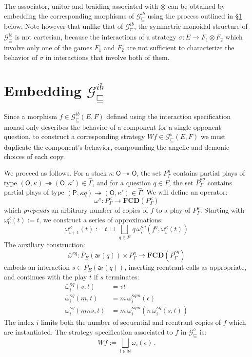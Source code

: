 \documentclass[draft,11pt]{report}
\newcommand{\gcat}{\mathcal{G}_{\sqsubseteq}}
\newcommand{\kw}[1]{\ensuremath{ \mathsf{#1} }}
\begin{document}
The associator, unitor and braiding
associated with $\otimes$
can be obtained by embedding
the corresponding morphisms of $\gcat^{ib}$
using the process outlined in \S\ref{sec:gamesem:emb} below.
Note however that unlike that of $\gcat^{ib}$,
the symmetric monoidal structure of $\gcat^{ib}$
is not cartesian,
because the interactions of a strategy
$\sigma : E \rightarrow F_1 \otimes F_2$
which involve only one of the games $F_1$ and $F_2$
are not sufficient to characterize the behavior of $\sigma$
in interactions that involve both of them.


\section{Embedding $\gcat^{ib}$} \label{sec:gamesem:emb} %

Since a morphism $f \in \gcat^{ib}(E,F)$
defined using the interaction specification monad
only describes the behavior of a component
for a single opponent question,
to construct a corresponding strategy $W f \in \gcat^b(E,F)$
we must duplicate the component's behavior,
compounding the angelic and demonic choices of each copy.

We proceed as follows.
For a stack
$\kappa : \kw{O} \twoheadrightarrow \kw{O}$,
the set $P^\kappa_\Gamma$ contains
partial plays of type
$(\kw{O}, \kappa) \twoheadrightarrow (\kw{O}, \kappa')
 \in \hat{\Gamma}$,
and for a question $q \in F$,
the set $\bar{P}^{\kappa q}_\Gamma$ contains
partial plays of type
$(\kw{P}, \kappa q) \twoheadrightarrow (\kw{O}, \kappa')
 \in \hat{\Gamma}$.
We will define an operator:
\[
  \omega^\kappa :
    P^\kappa_\Gamma \rightarrow
    \mathbf{FCD}(P^\kappa_\Gamma)
\]
which \emph{prepends} an arbitrary number of copies of $f$
to a play of $P^\kappa_\Gamma$.
Starting with 
$\omega^\kappa_0(t) := t$,
we construct a series of approximations:
\[
  \omega^\kappa_{i+1}(t) :=
    t \: \sqcup \:
    \bigsqcup_{q \in F} \,
      q \, \bar{\omega}^{\kappa q}_i(f^q, \omega^\kappa_i(t))
\]
The auxiliary construction:
\[
  \bar{\omega}^{\kappa q} :
    \bar{P}_E(\kw{ar}(q)) \times P^{\kappa}_\Gamma \rightarrow
    \mathbf{FCD}(\bar{P}^{\kappa q}_\Gamma)
\]
embeds an interaction $s \in \bar{P}_E(\kw{ar}(q))$,
inserting reentrant calls as appropriate,
and continues with the play $t$
if $s$ terminates:
\begin{align*}
  \bar{\omega}^{\kappa q}_i(\underline v, t) &=
    v t
  \\
  \bar{\omega}^{\kappa q}_i(\underline m, t) &=
    m \, \omega^{\kappa q m}_i(\epsilon)
  \\
  \bar{\omega}^{\kappa q}_i(\underline m n s, t) &=
    m \, \omega^{\kappa q m}_i(n \, \bar{\omega}^{\kappa q}_i(s, t))
\end{align*}
The index $i$ limits both the number of
sequential and reentrant copies of $f$
which are instantiated.
The strategy specification associated to $f$
in $\gcat^{b}$ is:
\[
    W f := \bigsqcup_{i \in \mathbb{N}} \omega_i(\epsilon) \,.
\]
\end{document}
